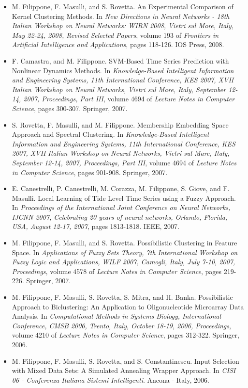 \begin{itemize}
\item  M. Filippone, F. Masulli, and S. Rovetta. An Experimental Comparison of Kernel Clustering Methods. In \emph{New Directions in Neural Networks - 18th Italian Workshop on Neural Networks: WIRN 2008, Vietri sul Mare, Italy, May 22-24, 2008, Revised Selected Papers}, volume 193 of \emph{Frontiers in Artificial Intelligence and Applications}, pages 118-126. IOS Press, 2008.
\item  F. Camastra, and M. Filippone. {SVM}-Based Time Series Prediction with Nonlinear Dynamics Methods. In \emph{Knowledge-Based Intelligent Information and Engineering Systems, 11th International Conference, KES 2007, XVII Italian Workshop on Neural Networks, Vietri sul Mare, Italy, September 12-14, 2007, Proceedings, Part III}, volume 4694 of \emph{Lecture Notes in Computer Science}, pages 300-307. Springer, 2007.
\item  S. Rovetta, F. Masulli, and M. Filippone. Membership Embedding Space Approach and Spectral Clustering. In \emph{Knowledge-Based Intelligent Information and Engineering Systems, 11th International Conference, KES 2007, XVII Italian Workshop on Neural Networks, Vietri sul Mare, Italy, September 12-14, 2007, Proceedings, Part III}, volume 4694 of \emph{Lecture Notes in Computer Science}, pages 901-908. Springer, 2007.
\item  E. Canestrelli, P. Canestrelli, M. Corazza, M. Filippone, S. Giove, and F. Masulli. Local Learning of Tide Level Time Series using a Fuzzy Approach. In \emph{Proceedings of the International Joint Conference on Neural Networks, IJCNN 2007, Celebrating 20 years of neural networks, Orlando, Florida, USA, August 12-17, 2007}, pages 1813-1818. IEEE, 2007.
\item  M. Filippone, F. Masulli, and S. Rovetta. Possibilistic Clustering in Feature Space. In \emph{Applications of Fuzzy Sets Theory, 7th International Workshop on Fuzzy Logic and Applications, WILF 2007, Camogli, Italy, July 7-10, 2007, Proceedings}, volume 4578 of \emph{Lecture Notes in Computer Science}, pages 219-226. Springer, 2007.
\item  M. Filippone, F. Masulli, S. Rovetta, S. Mitra, and H. Banka. Possibilistic Approach to Biclustering: An Application to Oligonucleotide Microarray Data Analysis. In \emph{Computational Methods in Systems Biology, International Conference, CMSB 2006, Trento, Italy, October 18-19, 2006, Proceedings}, volume 4210 of \emph{Lecture Notes in Computer Science}, pages 312-322. Springer, 2006.
\item  M. Filippone, F. Masulli, S. Rovetta, and S. Constantinescu. Input Selection with Mixed Data Sets: A Simulated Annealing Wrapper Approach. In \emph{CISI 06 - Conferenza Italiana Sistemi Intelligenti}. Ancona - Italy, 2006.

\end{itemize}
